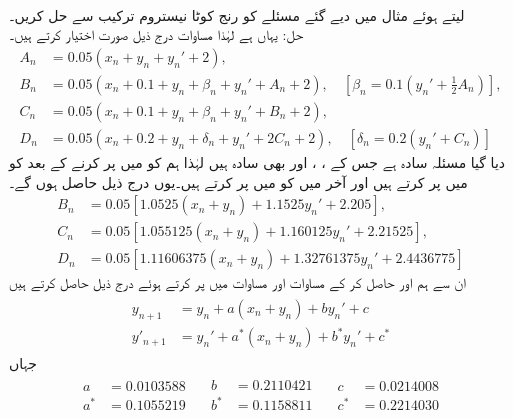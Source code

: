 \quad {}\\
 لیتے ہوئے مثال  میں دیے گئے مسئلے کو رنج کوٹا نیستروم ترکیب سے حل کریں۔\\
حل:\quad
یہاں  ہے لہٰذا مساوات  درج ذیل صورت اختیار کرتے ہیں۔
\begin{align*}
A_n&=0.05(x_n+y_n+y_n'+2),\\
B_n&=0.05(x_n+0.1+y_n+\beta_n+y_n'+A_n+2),\quad [\beta_n=0.1(y_n'+\tfrac{1}{2}A_n)],\\
C_n&=0.05(x_n+0.1+y_n+\beta_n+y_n'+B_n+2),\\
D_n&=0.05(x_n+0.2+y_n+\delta_n+y_n'+2C_n+2),\quad [\delta_n=0.2(y_n'+C_n)]
\end{align*} 
دیا گیا مسئلہ سادہ ہے  جس کے ، ،  اور  بھی سادہ ہیں لہٰذا ہم  کو  میں پر کرنے کے بعد  کو  میں پر کرتے ہیں اور آخر میں  کو  میں پر کرتے ہیں۔یوں درج ذیل حاصل ہوں گے۔
\begin{align*}
B_n&=0.05[\num{1.0525}(x_n+y_n)+\num{1.1525}y_n'+\num{2.205}],\\
C_n&=0.05[\num{1.055125}(x_n+y_n)+\num{1.160125}y_n'+\num{2.21525}],\\
D_n&=0.05[\num{1.11606375}(x_n+y_n)+\num{1.32761375}y_n'+\num{2.4436775}]
\end{align*} 
ان سے ہم  اور  حاصل کر کے مساوات  اور مساوات  میں پر کرتے ہوئے درج ذیل حاصل کرتے ہیں
\begin{gather}
\begin{aligned}
y_{n+1}&=y_n+a(x_n+y_n)+by_n'+c\\
y'_{n+1}&=y_n'+a^*(x_n+y_n)+b^*y_n'+c^*
\end{aligned}
\end{gather}
جہاں
\begin{gather*}
 \begin{aligned}
a&=\num{0.0103588}\\
a^*&=\num{0.1055219}
\end{aligned}\quad
\begin{aligned}
b&=\num{0.2110421}\\
b^*&=\num{0.1158811}
\end{aligned}\quad
\begin{aligned}
c&=\num{0.0214008}\\
c^*&=\num{0.2214030}
\end{aligned}
\end{gather*}
